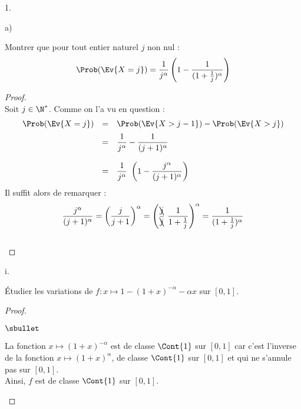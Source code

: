 \documentclass[11pt]{article}%
\begin{document}
\begin{noliste}{1.}
\begin{noliste}{a)}
  \item Montrer que pour tout entier naturel $j$ non nul :
    \[
    \Prob(\Ev{X=j}) = \dfrac{1}{j^{\alpha}} \left( 1 -
      \dfrac{1}{(1+\frac{1}{j})^{\alpha}}\right)
    \]
    
    \begin{proof}~\\
      Soit $j \in \N^*$. Comme on l'a vu en question  :
      \[
      \begin{array}{rcl}
        \Prob(\Ev{X = j}) & = & \Prob(\Ev{X > j-1}) - \Prob(\Ev{X >
          j})
        \\[.2cm]
        & = & \dfrac{1}{j^{\alpha}} - \dfrac{1}{(j+1)^{\alpha}} 
        \\[.6cm]
        & = & \dfrac{1}{j^{\alpha}} \ \left( 1 -
          \dfrac{j^\alpha}{(j+1)^{\alpha}} \right)
      \end{array}
      \]
      Il suffit alors de remarquer : 
      \[
      \dfrac{j^\alpha}{(j+1)^{\alpha}} = \left( \dfrac{j}{j+1}
      \right)^\alpha = \left(\dfrac{\bcancel{j}}{\bcancel{j}} \
        \dfrac{1}{1+\frac{1}{j}} \right)^\alpha = \dfrac{1}{(1 +
        \frac{1}{j})^\alpha}
      \]
      ~\\[-1cm]
    \end{proof}

  \item
    \begin{nonoliste}{i.}
    \item Étudier les variations de $f : x \mapsto 1-(1+x)^{-\alpha}-\alpha 
      x$ sur $[0,1]$. 

      \begin{proof}~%
        \begin{noliste}{$\sbullet$}
        \item La fonction $x \mapsto (1+x)^{-\alpha}$ est de classe
          $\Cont{1}$ sur $[0, 1]$ car c'est l'inverse de la fonction
          $x \mapsto (1 + x)^\alpha$, de classe $\Cont{1}$ sur $[0,
          1]$ et qui ne s'annule pas sur $[0, 1]$.\\
          Ainsi, $f$ est de classe $\Cont{1}$ sur $[0, 1]$.


\end{noliste}
\end{proof}
\end{nonoliste}
\end{noliste}
\end{noliste}
\end{document}
